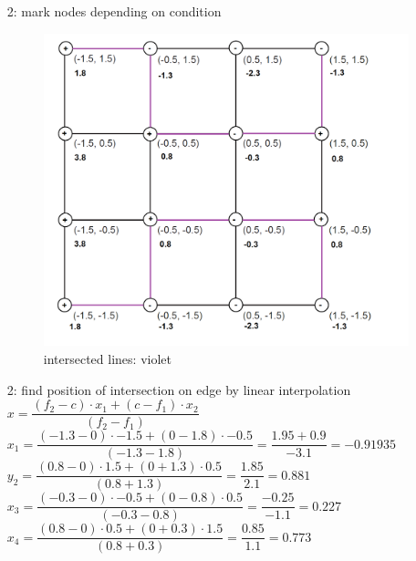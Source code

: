 \documentclass[a4paper]{article}
\begin{document}
\begin{enumerate}
	\item[2:] mark nodes depending on condition
			\begin{figure}[h!]
				\centering 
				\includegraphics[width=11cm]{7_2_2.png}
				\caption{intersected lines: violet}
				\label{}
			\end{figure}
		
	\item[2:] find position of intersection on edge by linear interpolation \\
		
			$x = \dfrac{(f_{2} - c) \cdot x_{1} + (c - f_{1}) \cdot x_{2}}{(f_{2} - f_{1})}$\\
			
			$ x_{1} = \dfrac{(-1.3 - 0) \cdot -1.5 + (0 - 1.8) \cdot -0.5}{(-1.3 - 1.8)} = \dfrac{1.95 + 0.9}{-3.1} = -0.91935$\\ 
			
			$y_{2} = \dfrac{(0.8 - 0) \cdot 1.5 + (0 + 1.3) \cdot 0.5}{(0.8 + 1.3)} = \dfrac{1.85}{2.1} = 0.881$\\
			
			$x_{3} = \dfrac{(-0.3 - 0) \cdot -0.5 + (0 - 0.8) \cdot 0.5}{(-0.3 - 0.8)} = \dfrac{-0.25}{-1.1} = 0.227$\\
			
			$x_{4} = \dfrac{(0.8 - 0) \cdot 0.5 + (0 + 0.3) \cdot 1.5}{(0.8 + 0.3)} = \dfrac{0.85}{1.1} =  0.773 $\\ 
			

\end{enumerate}
\end{document}
